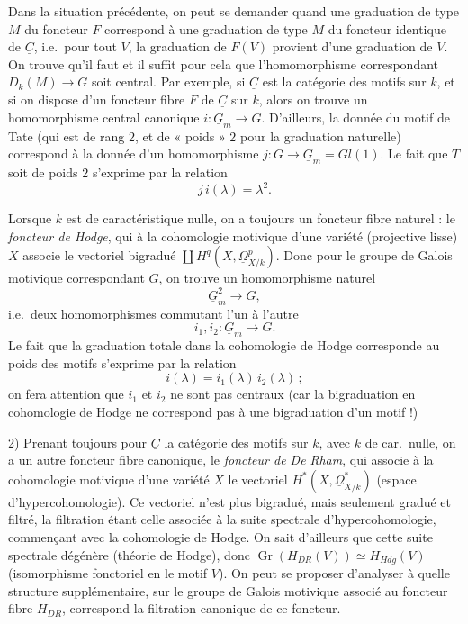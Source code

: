 \documentclass[11pt,a4paper]{article}
\begin{document}
Dans la situation précédente, on peut se demander quand une graduation de type
$M$ du foncteur $F$ correspond à une graduation de type $M$ du foncteur
identique de $\underline{C}$, i.e.\ pour tout $V$, la graduation de $F(V)$
provient d'une graduation de $V$. On trouve qu'il faut et il suffit pour cela
que l'homomorphisme correspondant $D_{k}(M) \to G$ soit central. Par exemple,
si $\underline{C}$ est la catégorie des motifs sur $k$, et si on dispose d'un
foncteur fibre $F$ de $\underline{C}$ sur $k$, alors on trouve un
homomorphisme central canonique $i : \underline{G}_{m} \to G$. D'ailleurs, la
donnée du motif de Tate (qui est de rang $2$, et de « poids » $2$ pour la
graduation naturelle) correspond à la donnée d'un homomorphisme
$j : G \to \underline{G}_{m} = Gl(1)$.
Le fait que $T$ soit de poids $2$ s'exprime par la relation
\[
j\,i(\lambda) = \lambda^{2} .
\]

Lorsque $k$ est de caractéristique nulle, on a toujours un foncteur fibre
naturel : le \emph{foncteur de Hodge}, qui à la cohomologie motivique d'une
variété (projective lisse) $X$ associe le vectoriel bigradué
$\coprod H^{q}(X, \underline{\Omega}^{p}_{X/k})$. Donc pour le groupe de
Galois motivique correspondant $G$, on trouve un homomorphisme naturel
\[
\underline{G}_{m}^{2} \longrightarrow G ,
\]
i.e.\ deux homomorphismes commutant l'un à l'autre
\[
i_{1}, i_{2} : \underline{G}_{m} \longrightarrow G .
\]
Le fait que la graduation totale dans la cohomologie de Hodge corresponde au
poids des motifs s'exprime par la relation
\[
i(\lambda) = i_{1}(\lambda)\, i_{2}(\lambda) \, ;
\]
on fera attention que $i_{1}$ et $i_{2}$ ne sont pas centraux (car la
bigraduation en cohomologie de Hodge ne correspond pas à une bigraduation d'un
motif !)

2) Prenant toujours pour $\underline{C}$ la catégorie des motifs sur $k$, avec
$k$ de car.\ nulle, on a un autre foncteur fibre canonique, le \emph{foncteur
de De Rham}, qui associe à la cohomologie motivique d'une variété $X$ le
vectoriel $H^{*}(X, \underline{\Omega}^{*}_{X/k})$ (espace
d'hypercohomologie). Ce vectoriel n'est plus bigradué, mais seulement gradué
et filtré, la filtration étant celle associée à la suite spectrale
d'hypercohomologie, commençant avec la cohomologie de Hodge. On sait
d'ailleurs que cette suite spectrale dégénère (théorie de Hodge), donc
$\operatorname{Gr}(H_{DR}(V)) \simeq H_{Hdg}(V)$
(isomorphisme fonctoriel en le motif $V$). On peut se proposer d'analyser à
quelle structure supplémentaire, sur le groupe de Galois motivique associé au
foncteur fibre $H_{DR}$, correspond la filtration canonique de ce foncteur.
\end{document}
